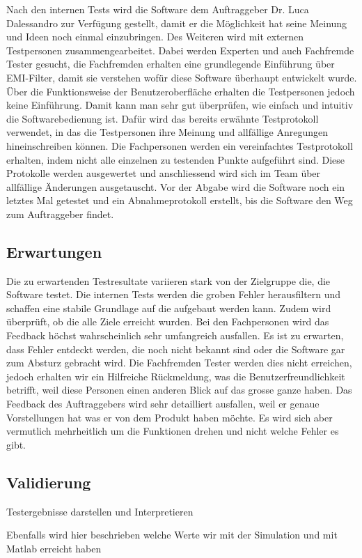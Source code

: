 Nach den internen Tests wird die Software dem Auftraggeber Dr. Luca Dalessandro zur Verfügung gestellt, damit er die Möglichkeit hat seine Meinung und Ideen noch einmal einzubringen. Des Weiteren wird mit externen Testpersonen zusammengearbeitet. 
Dabei werden Experten und auch Fachfremde Tester gesucht, die Fachfremden erhalten eine grundlegende Einführung über EMI-Filter, damit sie verstehen wofür diese Software überhaupt entwickelt wurde. 
Über die Funktionsweise der Benutzeroberfläche erhalten die Testpersonen jedoch keine Einführung. Damit kann man sehr gut überprüfen, wie einfach und intuitiv die Softwarebedienung ist. Dafür wird das bereits erwähnte Testprotokoll verwendet, in das die Testpersonen ihre Meinung und allfällige Anregungen hineinschreiben können. Die Fachpersonen werden ein vereinfachtes Testprotokoll erhalten, indem nicht alle einzelnen zu testenden Punkte aufgeführt sind.  
Diese Protokolle werden ausgewertet und anschliessend wird sich im Team über allfällige Änderungen ausgetauscht. 
Vor der Abgabe wird die Software noch ein letztes Mal getestet und ein Abnahmeprotokoll erstellt, bis die Software den Weg zum Auftraggeber findet.

 




\subsection{Erwartungen} \label{subsec:validierung}
Die zu erwartenden Testresultate variieren stark von der Zielgruppe die, die Software testet.
Die internen Tests werden die groben Fehler herausfiltern und schaffen eine stabile Grundlage auf die aufgebaut werden kann. Zudem wird überprüft, ob die alle Ziele erreicht wurden.
Bei den Fachpersonen wird das Feedback höchst wahrscheinlich sehr umfangreich   ausfallen. Es ist zu erwarten, dass Fehler entdeckt werden, die noch nicht bekannt sind oder die Software gar zum Absturz gebracht wird. 
Die Fachfremden Tester werden dies nicht erreichen, jedoch erhalten wir ein Hilfreiche Rückmeldung, was die Benutzerfreundlichkeit betrifft, weil diese Personen einen anderen Blick auf das grosse ganze haben. 
Das Feedback des Auftraggebers wird sehr detailliert ausfallen, weil er genaue Vorstellungen hat was er von dem Produkt haben möchte. Es wird sich aber vermutlich mehrheitlich um die Funktionen drehen und nicht welche Fehler es gibt. 



\subsection{Validierung} \label{subsec:validierung}
Testergebnisse darstellen und Interpretieren

Ebenfalls wird hier beschrieben welche Werte wir mit der Simulation und mit Matlab erreicht haben
